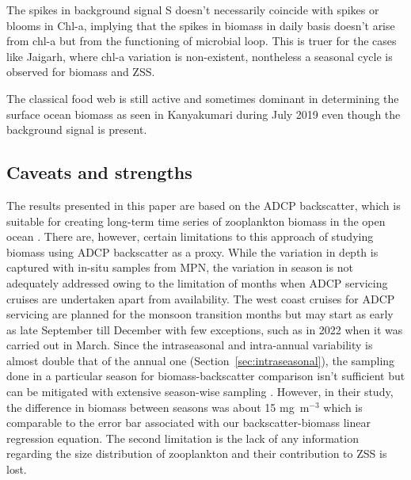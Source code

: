\documentclass[authoryear,review,11pt]{elsarticle}
\begin{document}
The spikes in background signal S doesn’t necessarily coincide with spikes or blooms in Chl-a, implying that the spikes in biomass in daily basis doesn’t arise from chl-a but from the functioning of microbial loop. This is truer for the cases like Jaigarh, where chl-a variation is non-existent, nontheless a seasonal cycle is observed for biomass and ZSS.

The classical food web is still active and sometimes dominant in determining the surface ocean biomass as seen in Kanyakumari during July 2019 even though the background signal is present.

\subsection{Caveats and strengths}
\label{sec:discuss.method}

The results presented in this paper are based on the ADCP backscatter, which is suitable for creating long-term time series of zooplankton biomass in the open ocean \citep{jiang2007temporal,hobbs2021marine,ursella2021diel,aparna2022seasonal}. There are, however, certain limitations to this approach of studying biomass using ADCP backscatter as a proxy. While the variation in depth is captured with in-situ samples from MPN, the variation in season is not adequately addressed owing to the limitation of months when ADCP servicing cruises are undertaken apart from availability. The west coast cruises for ADCP servicing are planned for the monsoon transition months but may start as early as late September till December with few exceptions, such as in 2022 when it was carried out in March. Since the intraseasonal and intra-annual variability is almost double that of the annual one (Section~\ref{sec:intraseasonal}), the sampling done in a particular season for biomass-backscatter comparison isn't sufficient but can be mitigated with extensive season-wise sampling \citep{jadhav2024abundance}. However, in their study, the difference in biomass between seasons was about 15 mg~m$^{-3}$ which is comparable to the error bar associated with our backscatter-biomass linear regression equation. The second limitation is the lack of any information regarding the size distribution of zooplankton and their contribution to ZSS is lost.
\end{document}
